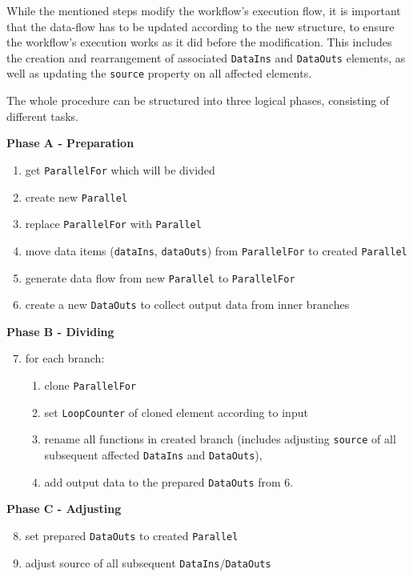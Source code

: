 \documentclass[a4paper,top=25mm,bottom=25mm,12pt,pdftex,halfparskip,twoside,bibtotoc,numbers=noenddot]{scrbook}
\begin{document}
While the mentioned steps modify the workflow's execution flow, it is important that the data-flow has to be updated according to the new structure, to ensure the workflow's execution works as it did before the modification. This includes the creation and rearrangement of associated \texttt{DataIns} and \texttt{DataOuts} elements, as well as updating the \texttt{source} property on all affected elements. 

The whole procedure can be structured into three logical phases, consisting of different tasks.

\textbf{Phase A - Preparation}
\begin{enumerate}
\item get \texttt{ParallelFor} which will be divided
\item create new \texttt{Parallel}
\item replace \texttt{ParallelFor} with \texttt{Parallel}
\item move data items (\texttt{dataIns}, \texttt{dataOuts}) from \texttt{ParallelFor} to created \texttt{Parallel}
\item generate data flow from new \texttt{Parallel} to \texttt{ParallelFor}
\item create a new \texttt{DataOuts} to collect output data from inner branches
\end{enumerate}

\textbf{Phase B - Dividing}
\begin{enumerate}
\setcounter{enumi}{6}
\item for each branch:
\begin{enumerate}
\item clone \texttt{ParallelFor}
\item set \texttt{LoopCounter} of cloned element according to input
\item rename all functions in created branch (includes adjusting \texttt{source} of all subsequent affected \texttt{DataIns} and \texttt{DataOuts}), 
\item add output data to the prepared \texttt{DataOuts} from 6.
\end{enumerate}
\end{enumerate}

\textbf{Phase C - Adjusting}
\begin{enumerate}
\setcounter{enumi}{7}
\item set prepared \texttt{DataOuts} to created \texttt{Parallel}
\item adjust source of all subsequent \texttt{DataIns}/\texttt{DataOuts}
\end{enumerate}
\end{document}
